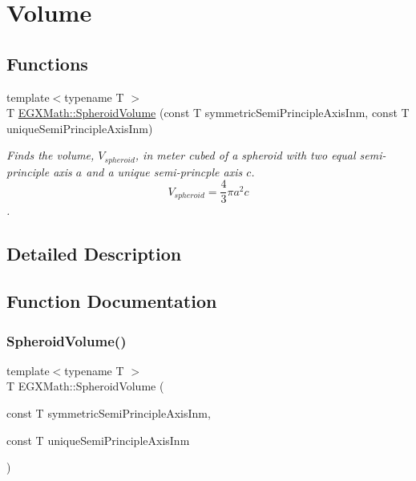 \hypertarget{group___e_g_x_math-_geometry-3_d-_spheroid-_volume}{}\section{Volume}
\label{group___e_g_x_math-_geometry-3_d-_spheroid-_volume}
\subsection*{Functions}
\begin{DoxyCompactItemize}
\item 
{\footnotesize template$<$typename T $>$ }\\T \mbox{\hyperlink{group___e_g_x_math-_geometry-3_d-_spheroid-_volume_gac89ed1e10e56c724b341591ecc5605dc}{E\+G\+X\+Math\+::\+Spheroid\+Volume}} (const T symmetric\+Semi\+Principle\+Axis\+Inm, const T unique\+Semi\+Principle\+Axis\+Inm)
\begin{DoxyCompactList}\small\item\em Finds the volume, $V_{spheroid}$, in meter cubed of a spheroid with two equal semi-\/principle axis $a$ and a unique semi-\/princple axis $c$. \[ V_{spheroid}=\frac{4}{3}\pi a^2 c \]. \end{DoxyCompactList}\end{DoxyCompactItemize}


\subsection{Detailed Description}


\subsection{Function Documentation}
\mbox{\label{group___e_g_x_math-_geometry-3_d-_spheroid-_volume_gac89ed1e10e56c724b341591ecc5605dc}} 
\subsubsection{\texorpdfstring{Spheroid\+Volume()}{SpheroidVolume()}}
{\footnotesize\ttfamily template$<$typename T $>$ \\
T E\+G\+X\+Math\+::\+Spheroid\+Volume (\begin{DoxyParamCaption}\item[{const T}]{symmetric\+Semi\+Principle\+Axis\+Inm,  }\item[{const T}]{unique\+Semi\+Principle\+Axis\+Inm }\end{DoxyParamCaption})}



